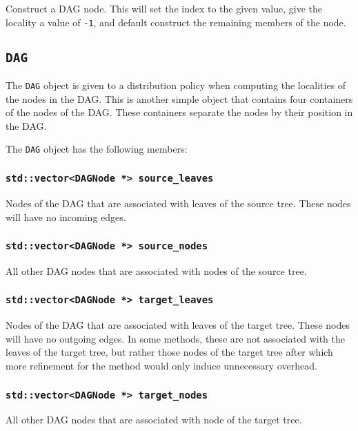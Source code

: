 Construct a DAG node. This will set the index to the given value, give the
locality a value of \texttt{-1}, and default construct the remaining members
of the node.


\subsection{\texttt{DAG}}

The \texttt{DAG} object is given to a distribution policy when computing the
localities of the nodes in the DAG. This is another simple object that contains
four containers of the nodes of the DAG. These containers separate the nodes
by their position in the DAG.

The \texttt{DAG} object has the following members:

\subsubsection{\texttt{std::vector<DAGNode *> source\_leaves}}

Nodes of the DAG that are associated with leaves of the source tree. These
nodes will have no incoming edges.

\subsubsection{\texttt{std::vector<DAGNode *> source\_nodes}}

All other DAG nodes that are associated with nodes of the source tree.

\subsubsection{\texttt{std::vector<DAGNode *> target\_leaves}}

Nodes of the DAG that are associated with leaves of the target tree. These
nodes will have no outgoing edges. In some methods, these are not associated
with the leaves of the target tree, but rather those nodes of the target
tree after which more refinement for the method would only induce
unnecessary overhead.

\subsubsection{\texttt{std::vector<DAGNode *> target\_nodes}}

All other DAG nodes that are associated with node of the target tree.



